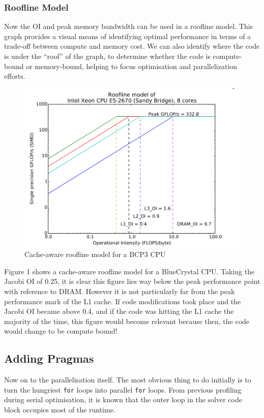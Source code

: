 \documentclass{article}
\begin{document}
\subsubsection{Roofline Model}
Now the OI and peak memory bandwidth can be used in a roofline
model. This graph provides a visual means of identifying optimal
performance in terms of a trade-off between compute and memory
cost. We can also identify where the code is under the ``roof'' of the
graph, to determine whether the code is compute-bound or memory-bound,
helping to focus optimisation and parallelization efforts.

\begin{figure}
\captionsetup{justification=centering}
\centering
\includegraphics[scale=0.4]{roofline}
\caption{Cache-aware roofline model for a BCP3 CPU}
\end{figure}

Figure 1 shows a cache-aware roofline model for a BlueCrystal
CPU. Taking the Jacobi OI of 0.25, it is clear this figure lies way
below the peak performance point with reference to DRAM. However it is
not particularly far from the peak performance mark of the L1
cache. If code modifications took place and the Jacobi OI became above
0.4, and if the code was hitting the L1 cache the majority of the
time, this figure would become relevant because then, the code would
change to be compute bound!

\subsection{Adding Pragmas}
Now on to the parallelisation itself. The most obvious thing to do
initially is to turn the hungriest \texttt{for} loops into parallel \texttt{for}
loops. From previous profiling during serial optimisation, it is known
that the outer loop in the solver code block occupies most of the
runtime.
\end{document}
